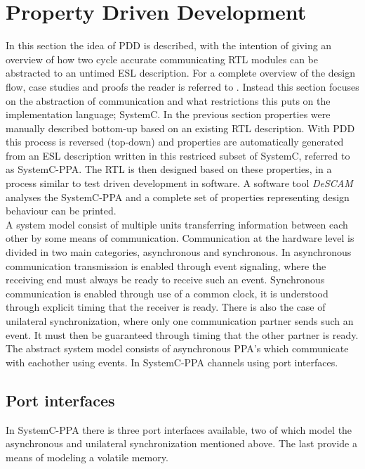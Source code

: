 \section{Property Driven Development}
\label{sec:pdd}
In this section the idea of PDD is described, with the intention of giving an overview of how two cycle accurate communicating RTL modules can be abstracted to an untimed ESL description. For a complete overview of the design flow, case studies and proofs the reader is referred to \cite{pddref}.  Instead this section focuses on the abstraction of communication and what restrictions this puts on the implementation language; SystemC. In the previous section properties were manually described bottom-up based on an existing RTL description. With PDD this process is reversed (top-down) and properties are automatically generated from an ESL description written in this restriced subset of SystemC, referred to as SystemC-PPA. The RTL is then designed based on these properties, in a process similar to test driven development in software. A software tool \textit{DeSCAM} \cite{descam} analyses the SystemC-PPA and a complete set of properties representing design behaviour can be printed.\\
\newline
A system model consist of multiple units transferring information between each other by some means of communication. Communication at the hardware level is divided in two main categories, asynchronous and synchronous. In asynchronous communication transmission is enabled through event signaling, where the receiving end must always be ready to receive such an event. Synchronous communication is enabled through use of a common clock, it is understood through explicit timing that the receiver is ready. There is also the case of unilateral synchronization, where only one communication partner sends such an event. It must then be guaranteed through timing that the other partner is ready. The abstract system model consists of asynchronous PPA's which communicate with eachother using events. In SystemC-PPA  channels using port interfaces. 

\subsection{Port interfaces}
\label{subsec:ports}       
In SystemC-PPA there is three port interfaces available, two of which model the asynchronous and unilateral synchronization mentioned above. The last provide a means of modeling a volatile memory. 

